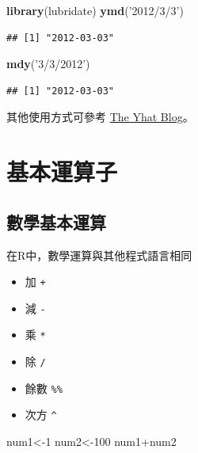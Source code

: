 \documentclass[]{book}
\newenvironment{Shaded}{\begin{snugshade}}{\end{snugshade}}
\newcommand{\KeywordTok}[1]{\textcolor[rgb]{0.13,0.29,0.53}{\textbf{{#1}}}}
\newcommand{\DecValTok}[1]{\textcolor[rgb]{0.00,0.00,0.81}{{#1}}}
\newcommand{\StringTok}[1]{\textcolor[rgb]{0.31,0.60,0.02}{{#1}}}
\newcommand{\NormalTok}[1]{{#1}}
\providecommand{\tightlist}{%
  \setlength{\itemsep}{0pt}\setlength{\parskip}{0pt}}
\theoremstyle{definition}
\theoremstyle{definition}
\theoremstyle{remark}
\begin{document}
\begin{Shaded}
\begin{Highlighting}[]
\KeywordTok{library}\NormalTok{(lubridate)}
\KeywordTok{ymd}\NormalTok{(}\StringTok{'2012/3/3'}\NormalTok{)}
\end{Highlighting}
\end{Shaded}

\begin{verbatim}
## [1] "2012-03-03"
\end{verbatim}

\begin{Shaded}
\begin{Highlighting}[]
\KeywordTok{mdy}\NormalTok{(}\StringTok{'3/3/2012'}\NormalTok{)}
\end{Highlighting}
\end{Shaded}

\begin{verbatim}
## [1] "2012-03-03"
\end{verbatim}

其他使用方式可參考
\href{http://blog.yhat.com/static/pdf/R_date_cheat_sheet.pdf}{The Yhat
Blog}。

\section{基本運算子}

\subsection{數學基本運算}

在R中，數學運算與其他程式語言相同

\begin{itemize}
\tightlist
\item
  加 \texttt{+}
\item
  減 \texttt{-}
\item
  乘 \texttt{*}
\item
  除 \texttt{/}
\item
  餘數 \texttt{\%\%}
\item
  次方 \texttt{\^{}}
\end{itemize}

\begin{Shaded}
\begin{Highlighting}[]
\NormalTok{num1<-}\DecValTok{1}
\NormalTok{num2<-}\DecValTok{100}
\NormalTok{num1+num2}
\end{Highlighting}
\end{Shaded}
\end{document}
